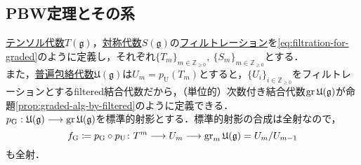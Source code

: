 \documentclass[rep_main]{subfiles}
\begin{document}
\subsection{PBW定理とその系}
\hyperref[def:tensor-alg]{テンソル代数}$T(\mathfrak{g})$，\hyperref[def:sym-alg]{対称代数}$S(\mathfrak{g})$の\hyperref[def:filtration]{フィルトレーション}を\eqref{eq:filtration-for-graded}のように定義し，それぞれ$\{T_m\}_{m \in \mathbb{Z}_{\geq 0}},\ \{S_m\}_{m \in \mathbb{Z}_{\geq 0}}$とする．\\
また，\hyperref[def:univ-env-alg]{普遍包絡代数}$\mathfrak{U}(\mathfrak{g})$は$U_m = p_\text{U}(T_m)$とすると，$\{U_i\}_{i \in \mathbb{Z}_{\geq 0}}$をフィルトレーションとするfiltered結合代数だから，（単位的）次数付き結合代数$\operatorname{gr} \mathfrak{U}(\mathfrak{g})$が命題\ref{prop:graded-alg-by-filtered}のように定義できる．\\
$p_\text{G}: \mathfrak{U}(\mathfrak{g}) \longrightarrow \operatorname{gr}\mathfrak{U}(\mathfrak{g})$を標準的射影とする．標準的射影の合成は全射なので，
\begin{equation}
	f_\text{G} \coloneqq p_\text{G}\circ p_\text{U} \colon T^m \longrightarrow U_m \longrightarrow \operatorname{gr}_m \mathfrak{U}(\mathfrak{g}) = U_m/U_{m-1}
\end{equation}
も全射．
\end{document}
